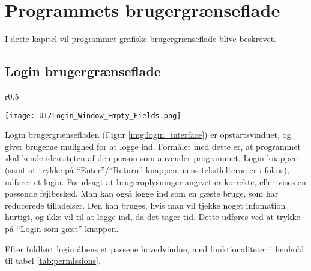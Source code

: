 \chapter{Programmets brugergrænseflade}
I dette kapitel vil programmet grafiske brugergrænseflade blive beskrevet.

\section{Login brugergrænseflade}
\begin{wrapfigure}{r}{0.5\textwidth}
    \label{img:login_interface}
    \vspace{-20pt}
    \begin{center}
        \texttt{[image: UI/Login\_Window\_Empty\_Fields.png]}
    \end{center}
    \vspace{-15pt}
    \caption{Login interface}
\end{wrapfigure}

Login brugergrænsefladen (Figur \ref{img:login_interface}) er opstartsvinduet, og giver brugerne mulighed for at logge ind.
Formålet med dette er, at programmet skal kende identiteten af den person som anvender programmet.
Login knappen (samt at trykke på ``Enter''/``Return''-knappen mens tekstfelterne er i fokus), udfører et login. 
Forudsagt at brugeroplysninger angivet er korrekte, eller vises en passende fejlbesked.
Man kan også logge ind som en gæste bruge, som har reducerede tilladelser. 
Den kan bruges, hvis man vil tjekke noget infomation hurtigt, og ikke vil til at logge ind, da det tager tid.
Dette udføres ved at trykke på ``Login som gæst''-knappen. 

Efter fuldført login åbens et passene hovedvindue, med funktionaliteter i henhold til tabel \ref{tab:permissions}.

